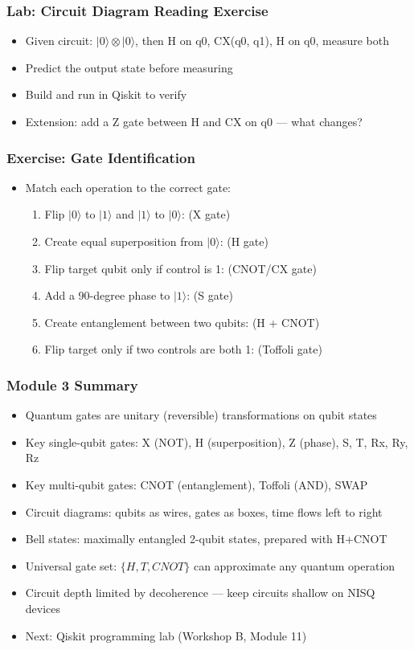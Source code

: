 \begin{frame}[fragile]\frametitle{Lab: Circuit Diagram Reading Exercise}
\begin{itemize}
\item Given circuit: $|0\rangle \otimes |0\rangle$, then H on q0, CX(q0, q1), H on q0, measure both
\item Predict the output state before measuring
\item Build and run in Qiskit to verify
\item Extension: add a Z gate between H and CX on q0 --- what changes?
\end{itemize}
\end{frame}

\begin{frame}[fragile]\frametitle{Exercise: Gate Identification}
\begin{itemize}
\item Match each operation to the correct gate:
\begin{enumerate}
  \item Flip $|0\rangle$ to $|1\rangle$ and $|1\rangle$ to $|0\rangle$: (X gate)
  \item Create equal superposition from $|0\rangle$: (H gate)
  \item Flip target qubit only if control is 1: (CNOT/CX gate)
  \item Add a 90-degree phase to $|1\rangle$: (S gate)
  \item Create entanglement between two qubits: (H + CNOT)
  \item Flip target only if two controls are both 1: (Toffoli gate)
\end{enumerate}
\end{itemize}
\end{frame}

\begin{frame}[fragile]\frametitle{Module 3 Summary}
\begin{itemize}
\item Quantum gates are unitary (reversible) transformations on qubit states
\item Key single-qubit gates: X (NOT), H (superposition), Z (phase), S, T, Rx, Ry, Rz
\item Key multi-qubit gates: CNOT (entanglement), Toffoli (AND), SWAP
\item Circuit diagrams: qubits as wires, gates as boxes, time flows left to right
\item Bell states: maximally entangled 2-qubit states, prepared with H+CNOT
\item Universal gate set: $\{H, T, CNOT\}$ can approximate any quantum operation
\item Circuit depth limited by decoherence --- keep circuits shallow on NISQ devices
\item Next: Qiskit programming lab (Workshop B, Module 11)
\end{itemize}
\end{frame}
